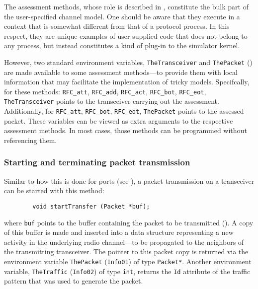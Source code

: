 The assessment methods, whose role is described in ,
constitute the bulk part of the user-specified channel model.
One should be aware that they execute in a context that is somewhat
different from that of a protocol process.
In this respect,
they are unique examples of user-supplied code that does not belong to any
process, but instead constitutes a kind of plug-in to the simulator kernel.

However, two standard environment variables, {\tt TheTransceiver} and
{\tt ThePacket} () are made available to some
assessment methods---to provide them with local information that may
facilitate the implementation of tricky models.
Specifcally, for these methods:
{\tt RFC\_att},
{\tt RFC\_add},
{\tt RFC\_act},
{\tt RFC\_bot},
{\tt RFC\_eot},
{\tt TheTransceiver} points to the transceiver carrying out the
assessment.
Additionally, for 
{\tt RFC\_att},
{\tt RFC\_bot},
{\tt RFC\_eot},
{\tt ThePacket} points to the assessed packet.
These variables can be viewed as extra arguments to the respective
assessment methods.
In most cases, those methods can be programmed without referencing them.

\subsubsection{Starting and terminating packet transmission}
\label{rm_tr_ac_st}

Similar to how this is done for ports (see ),
a packet transmission on a transceiver can be started with this 
method:
\begin{verbatim}
        void startTransfer (Packet *buf);
\end{verbatim}
where {\tt buf} points to the buffer
containing the packet to be transmitted ().
A copy of this buffer is made and inserted into a data structure representing
a new activity in the underlying radio channel---to be propagated to the
neighbors of the transmitting transceiver.
The pointer to this packet copy is returned via the environment
variable {\tt ThePacket} ({\tt Info01}) of type {\tt Packet*}.
Another environment variable, {\tt TheTraffic} ({\tt Info02}) of type
{\tt int}, returns the {\tt Id} attribute of the traffic pattern that was
used to generate the packet.

